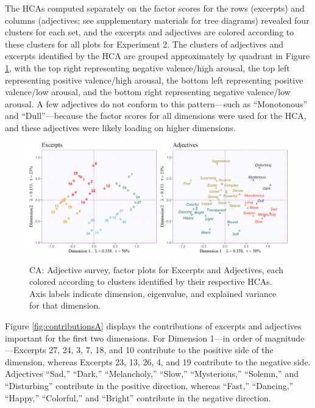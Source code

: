\documentclass[
  english,
  man]{apa6}
\begin{document}
The HCAs computed separately on the factor scores for the rows (excerpts) and columns (adjectives; see supplementary materials for tree diagrams) revealed four clusters for each set, and the excerpts and adjectives are colored according to these clusters for all plots for Experiment 2. The clusters of adjectives and excerpts identified by the HCA are grouped approximately by quadrant in Figure \ref{fig:factormapsA}, with the top right representing negative valence/high arousal, the top left representing positive valence/high arousal, the bottom left representing positive valence/low arousal, and the bottom right representing negative valence/low arousal. A few adjectives do not conform to this pattern---such as ``Monotonous'' and ``Dull''---because the factor scores for all dimensions were used for the HCA, and these adjectives were likely loading on higher dimensions.

\begin{figure}   
  \centering  
  \caption{CA: Adjective survey, factor plots for Excerpts and Adjectives, each colored according to clusters identified by their respective HCAs. Axis labels indicate dimension, eigenvalue, and explained variance for that dimension.}
    \includegraphics{./Music-Descriptor-Space_files/figure-latex/factormapsAcode-1.png}
  \label{fig:factormapsA}
\end{figure}

Figure \ref{fig:contributionsA} displays the contributions of excerpts and adjectives important for the first two dimensions. For Dimension 1---in order of magnitude---Excerpts 27, 24, 3, 7, 18, and 10 contribute to the positive side of the dimension, whereas Excerpts 23, 13, 26, 4, and 19 contribute to the negative side. Adjectives ``Sad,'' ``Dark,'' ``Melancholy,'' ``Slow,'' ``Mysterious,'' ``Solemn,'' and ``Disturbing'' contribute in the positive direction, whereas ``Fast,'' ``Dancing,'' ``Happy,'' ``Colorful,'' and ``Bright'' contribute in the negative direction.
\end{document}
